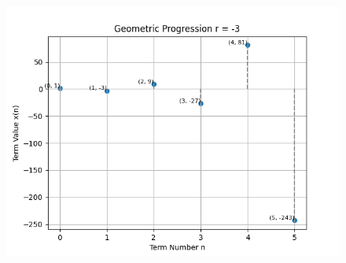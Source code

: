 \documentclass[journal,12pt,twocolumn]{IEEEtran}
\theoremstyle{remark}
\begin{document}
\begin{figure}
   \centering
     \includegraphics[width=1\columnwidth, height=1\columnwidth]{figs/graph1.png}
     \caption{}
\end{figure}
\end{document}

